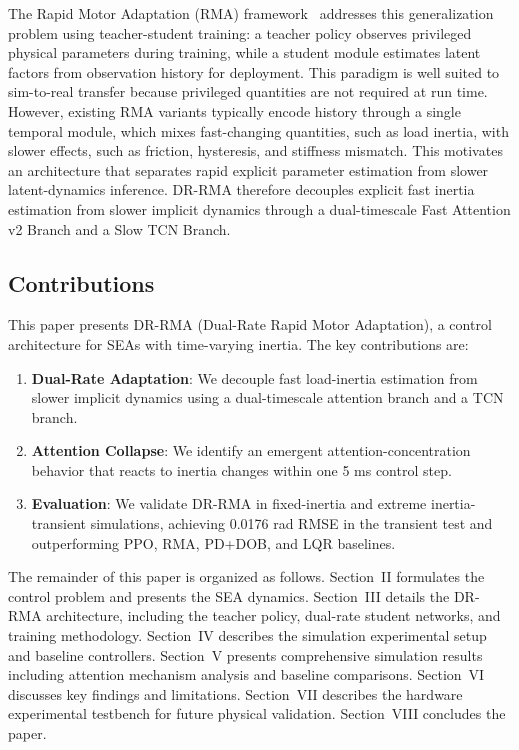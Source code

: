 \documentclass[lettersize,journal]{IEEEtran}
\begin{document}
The Rapid Motor Adaptation (RMA) framework~\cite{kumar2021RMA} addresses this generalization problem using teacher-student training: a teacher policy observes privileged physical parameters during training, while a student module estimates latent factors from observation history for deployment. This paradigm is well suited to sim-to-real transfer because privileged quantities are not required at run time. However, existing RMA variants typically encode history through a single temporal module, which mixes fast-changing quantities, such as load inertia, with slower effects, such as friction, hysteresis, and stiffness mismatch. This motivates an architecture that separates rapid explicit parameter estimation from slower latent-dynamics inference. DR-RMA therefore decouples explicit fast inertia estimation from slower implicit dynamics through a dual-timescale Fast Attention v2 Branch and a Slow TCN Branch.

\subsection{Contributions}

This paper presents DR-RMA (Dual-Rate Rapid Motor Adaptation), a control architecture for SEAs with time-varying inertia. The key contributions are:

\begin{enumerate}
\item \textbf{Dual-Rate Adaptation}: We decouple fast load-inertia estimation from slower implicit dynamics using a dual-timescale attention branch and a TCN branch.

\item \textbf{Attention Collapse}: We identify an emergent attention-concentration behavior that reacts to inertia changes within one 5 ms control step.

\item \textbf{Evaluation}: We validate DR-RMA in fixed-inertia and extreme inertia-transient simulations, achieving 0.0176 rad RMSE in the transient test and outperforming PPO, RMA, PD+DOB, and LQR baselines.
\end{enumerate}

The remainder of this paper is organized as follows. Section~II formulates the control problem and presents the SEA dynamics. Section~III details the DR-RMA architecture, including the teacher policy, dual-rate student networks, and training methodology. Section~IV describes the simulation experimental setup and baseline controllers. Section~V presents comprehensive simulation results including attention mechanism analysis and baseline comparisons. Section~VI discusses key findings and limitations. Section~VII describes the hardware experimental testbench for future physical validation. Section~VIII concludes the paper.
\end{document}
